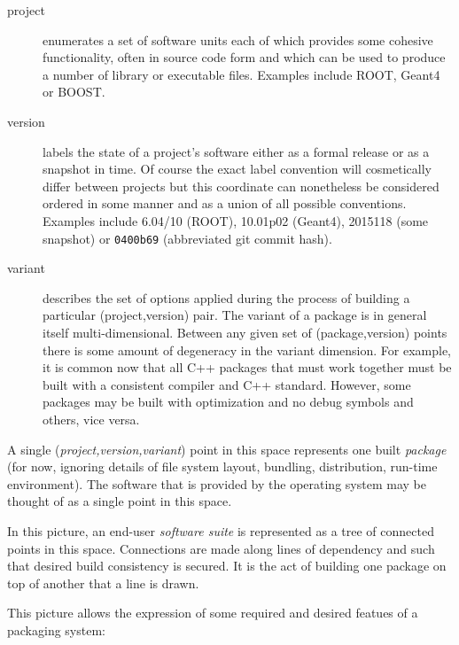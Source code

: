 \documentclass[12pt,a4paper]{article}
\begin{document}
\begin{description}

\item[project] enumerates a set of software units each of which provides
some cohesive functionality, often in source code form and which can be
used to produce a number of library or executable files.  Examples
include ROOT, Geant4 or BOOST.

\item[version] labels the state of a project's software either as a
formal release or as a snapshot in time.  Of course the exact label
convention will cosmetically differ between projects but this coordinate
can nonetheless be considered ordered in some manner and as a union of
all possible conventions.  Examples include 6.04/10 (ROOT), 10.01p02
(Geant4), 2015118 (some snapshot) or \texttt{0400b69} (abbreviated git
commit hash).

\item[variant] describes the set of options applied during the process
of building a particular (project,version) pair.  The variant of a
package is in general itself multi-dimensional.  Between any given set
of (package,version) points there is some amount of degeneracy in the
variant dimension.  For example, it is common now that all C++ packages
that must work together must be built with a consistent compiler and C++
standard.  However, some packages may be built with optimization and no
debug symbols and others, vice versa.

\end{description}

A single (\textit{project,version,variant}) point in this space
represents one built \textit{package} (for now, ignoring details of file
system layout, bundling, distribution, run-time environment).  The
software that is provided by the operating system may be thought of as a
single point in this space.

In this picture, an end-user \textit{software suite} is represented as a
tree of connected points in this space.  Connections are made along
lines of dependency and such that desired build consistency is secured.
It is the act of building one package on top of another that a line is
drawn.

This picture allows the expression of some required and desired featues
of a packaging system:
\end{document}
